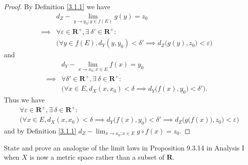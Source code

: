 \begin{proof}
    By Definition \ref{3.1.1} we have
    \begin{align*}
                 & d_Z - \lim_{y \to y_0 ; y \in f(E)} g(y) = z_0                                                    \\
        \implies & \forall \varepsilon \in \mathbf{R}^+, \exists\ \delta' \in \mathbf{R}^+ :                         \\
                 & \Big(\forall y \in f(E), d_Y(y, y_0) < \delta' \implies d_Z\big(g(y), z_0\big) < \varepsilon\Big)
    \end{align*}
    and
    \begin{align*}
                 & d_Y - \lim_{x \to x_0 ; x \in E} f(x) = y_0                                                \\
        \implies & \forall \delta' \in \mathbf{R}^+, \exists\ \delta \in \mathbf{R}^+ :                       \\
                 & \Big(\forall x \in E, d_X(x, x_0) < \delta \implies d_Y\big(f(x), y_0\big) < \delta'\Big).
    \end{align*}
    Thus we have
    \begin{align*}
         & \forall \varepsilon \in \mathbf{R}^+, \exists\ \delta \in \mathbf{R}^+ :                                                                             \\
         & \bigg(\forall x \in E, d_X(x, x_0) < \delta \implies d_Y\big(f(x), y_0\big) < \delta' \implies d_Z\Big(g\big(f(x)\big), z_0\Big) < \varepsilon\bigg)
    \end{align*}
    and by Definition \ref{3.1.1} \(d_Z - \lim_{x \to x_0 ; x \in E} g \circ f(x) = z_0\).
\end{proof}

\begin{exercise}\label{ex 3.1.6}
    State and prove an analogue of the limit laws in Proposition 9.3.14 in Analysis I when \(X\) is now a metric space rather than a subset of \(\mathbf{R}\).
\end{exercise}

